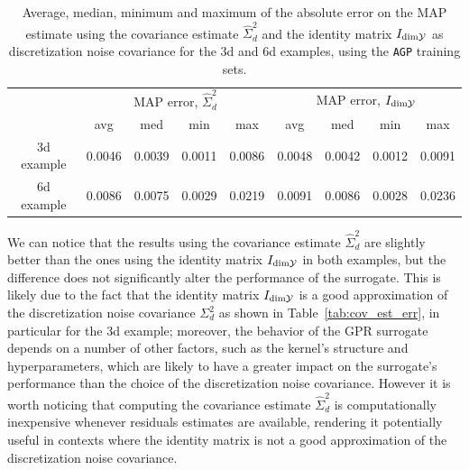 \begin{table}[H]
    \begin{centering}
        
    
    \begin{tabular}{ccccccccc}
    \toprule
        & \multicolumn{4}{c}{MAP error, $\hat \Sigma_d^2$} & \multicolumn{4}{c}{MAP error, $I_{\text{dim} \mathcal Y }$} \\ 
        & avg   & med   & min   & max   & avg   & med   & min   & max \\
        \midrule
        3d example   
        &0.0046 & 0.0039 & 0.0011 & 0.0086  &  0.0048 &  0.0042   &  0.0012  & 0.0091   \\
        6d example
        & 0.0086 & 0.0075 & 0.0029 & 0.0219  & 0.0091 &  0.0086   &  0.0028  & 0.0236   \\
    \bottomrule
    \end{tabular}
    \caption{Average, median, minimum and maximum of the absolute error on the MAP estimate using the covariance estimate $\hat \Sigma_d^2$ and the identity matrix $I_{\text{dim} \mathcal Y}$ as discretization noise covariance for the 3d and 6d examples, using the \texttt{AGP} training sets.
    }
    \label{tab:cov_est_map}
    \end{centering}
\end{table}

We can notice that the results using the covariance estimate $\hat \Sigma_d^2$ are slightly better than the ones using the identity matrix $I_{\text{dim} \mathcal Y}$ in both examples, but the difference does not significantly alter the performance of the surrogate.
This is likely due to the fact that the identity matrix $I_{\text{dim} \mathcal Y}$ is a good approximation of the discretization noise covariance $\Sigma_d^2$ as shown in Table~\ref{tab:cov_est_err}, in particular for the 3d example; moreover, the behavior of the GPR surrogate depends on a number of other factors, such as the kernel's structure and hyperparameters, which are likely to have a greater impact on the surrogate's performance than the choice of the discretization noise covariance.
However it is worth noticing that computing the covariance estimate $\hat \Sigma_d^2$ is computationally inexpensive whenever residuals estimates are available, rendering it potentially useful in contexts where the identity matrix is not a good approximation of the discretization noise covariance.